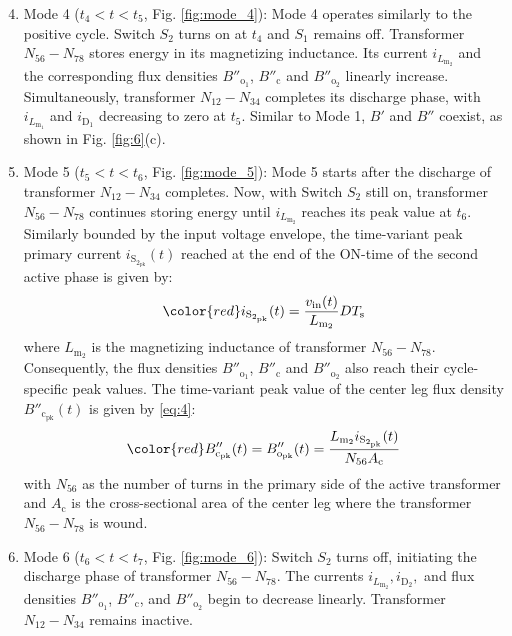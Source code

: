 \documentclass[lettersize,journal]{IEEEtran}
\begin{document}
\begin{enumerate}
    \setcounter{enumi}{3}
    \item Mode 4 ($t_4 < t < t_5$, Fig. \ref{fig:mode_4}): Mode 4 operates similarly to the positive cycle. Switch $S_2$ turns on at $t_4$ and $S_1$ remains off. Transformer $N_{56}-N_{78}$ stores energy in its magnetizing inductance. Its current $i_{L_{\mathrm{m}_2}}$ and the corresponding flux densities $B''_{\mathrm{o}_1}$, $B''_{\mathrm{c}}$ and $B''_{\mathrm{o}_2}$ linearly increase. Simultaneously, transformer $N_{12}-N_{34}$ completes its discharge phase, with $i_{L_{\mathrm{m}_1}}$ and $i_{\mathrm{D}_1}$ decreasing to zero at $t_5$. {\color{red} Similar to Mode 1,  $B'$ and $B''$ coexist, as shown in Fig. \ref{fig:6}(c).}

    \item Mode 5 ($t_5 < t < t_6$, Fig. \ref{fig:mode_5}): Mode 5 starts after the discharge of transformer $N_{12}-N_{34}$ completes. Now, with Switch $S_2$ still on, transformer $N_{56}-N_{78}$ continues storing energy until $i_{L_{\mathrm{m}_2}}$ reaches its peak value at $t_6$. {\color{red} Similarly bounded by the input voltage envelope, the time-variant peak primary current $i_{\mathrm{S}_{2_{\mathrm{pk}}}}(t)$ reached at the end of the ON-time of the second active phase is given by:}
    \begin{equation}
    \label{eq:3}
    {\color{red} i_{\mathrm{S}_{2_{\mathrm{pk}}}}(t) = \frac{v_{\mathrm{in}}(t)}{L_{\mathrm{m}_2}} D T_{\mathrm{s}} }
    \end{equation}
    where $L_{\mathrm{m}_2}$ is the magnetizing inductance of transformer $N_{56}-N_{78}$. {\color{red} Consequently, the flux densities $B''_{\mathrm{o}_1}$, $B''_{\mathrm{c}}$ and $B''_{\mathrm{o}_2}$ also reach their cycle-specific peak values. The time-variant peak value of the center leg flux density $B''_{\mathrm{c}_{\mathrm{pk}}}(t)$ is given by \eqref{eq:4}:}
    \begin{equation}
    \label{eq:4}
    {\color{red} B''_{\mathrm{c}_{\mathrm{pk}}}(t) = B''_{\mathrm{o}_{\mathrm{pk}}}(t) = \frac{L_{\mathrm{m}_2} i_{\mathrm{S}_{2_{\mathrm{pk}}}}(t)}{N_{56} A_{\mathrm{c}}} }
    \end{equation}
    with $N_{56}$ as the number of turns in the primary side of the active transformer and $A_{\mathrm{c}}$ is the cross-sectional area of the center leg where the transformer $N_{56}-N_{78}$ is wound.

    \item Mode 6 ($t_6 < t < t_7$, Fig. \ref{fig:mode_6}): Switch $S_2$ turns off, initiating the discharge phase of transformer $N_{56}-N_{78}$. The currents $i_{L_{\mathrm{m}_2}}, i_{\mathrm{D}_2},$ and flux densities $B''_{\mathrm{o}_1}$, $B''_{\mathrm{c}}$, and $B''_{\mathrm{o}_2}$ begin to decrease linearly. Transformer $N_{12}-N_{34}$ remains inactive.
\end{enumerate}
\end{document}
